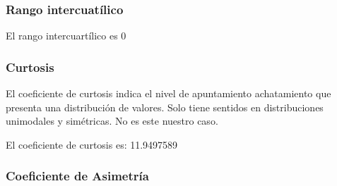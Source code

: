 \documentclass[
  12 pt,
  a4paper,
]{article}
\newenvironment{Shaded}{\begin{snugshade}}{\end{snugshade}}
\newcommand{\AttributeTok}[1]{\textcolor[rgb]{0.13,0.29,0.53}{#1}}
\newcommand{\CommentTok}[1]{\textcolor[rgb]{0.56,0.35,0.01}{\textit{#1}}}
\newcommand{\ConstantTok}[1]{\textcolor[rgb]{0.56,0.35,0.01}{#1}}
\newcommand{\FunctionTok}[1]{\textcolor[rgb]{0.13,0.29,0.53}{\textbf{#1}}}
\newcommand{\NormalTok}[1]{#1}
\newcommand{\OtherTok}[1]{\textcolor[rgb]{0.56,0.35,0.01}{#1}}
\newcommand{\SpecialCharTok}[1]{\textcolor[rgb]{0.81,0.36,0.00}{\textbf{#1}}}
\begin{document}
\hypertarget{rango-intercuatuxedlico}{%
\subsubsection{Rango intercuatílico}\label{rango-intercuatuxedlico}}

\begin{Shaded}
\end{Shaded}

El rango intercuartílico es 0

\hypertarget{curtosis}{%
\subsubsection{Curtosis}\label{curtosis}}

El coeficiente de curtosis indica el nivel de apuntamiento achatamiento
que presenta una distribución de valores. Solo tiene sentidos en
distribuciones unimodales y simétricas. No es este nuestro caso.

\begin{Shaded}
\end{Shaded}

El coeficiente de curtosis es: 11.9497589

\hypertarget{coeficiente-de-asimetruxeda}{%
\subsubsection{Coeficiente de
Asimetría}\label{coeficiente-de-asimetruxeda}}

\begin{Shaded}
\end{Shaded}
\end{document}
